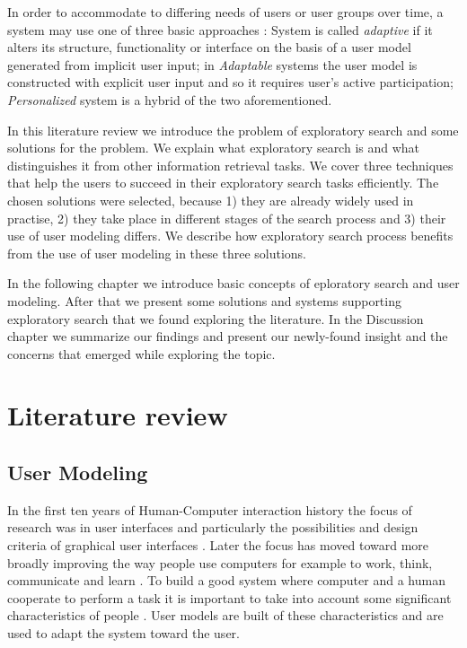 \documentclass{sigchi}
\begin{document}
In order to accommodate to differing needs of users or user groups over time, a system may use one of three basic approaches \cite{van08}: System is called \textit{adaptive} if it alters its structure, functionality or interface on the basis of a user model generated from implicit user input; in \textit{Adaptable} systems the user model is constructed with explicit user input and so it requires user's active participation; \textit{Personalized} system is a hybrid of the two aforementioned. 

In this literature review we introduce the problem of exploratory search and some solutions for the problem. We explain what exploratory search is and what distinguishes it from other information retrieval tasks. We cover three techniques that help the users to succeed in their exploratory search tasks efficiently. The chosen solutions were selected, because 1) they are already widely used in practise, 2) they take place in different stages of the search process and 3) their use of user modeling differs. We describe how exploratory search process benefits from the use of user modeling in these three solutions.

In the following chapter we introduce basic concepts of eploratory search and user modeling. After that we present some solutions and systems supporting exploratory search that we found exploring the literature. In the Discussion chapter we summarize our findings and present our newly-found insight and the concerns that emerged while exploring the topic.


\section{Literature review}
\label{sec:litreview}



\subsection{User Modeling}

In the first ten years of Human-Computer interaction history the focus of research was in user interfaces and particularly the possibilities and design criteria of graphical user interfaces \cite{fischer01}. Later the focus has moved toward more broadly improving the way people use computers for example to work, think, communicate and learn \cite{fischer01}. To build a good system where computer and a human cooperate to perform a task it is important to take into account some significant characteristics of people \cite{rich99}. User models are built of these characteristics and are used to adapt the system toward the user.
\end{document}
